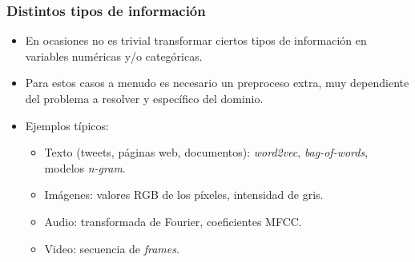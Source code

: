\documentclass{beamer}
\begin{document}
\begin{frame}
\frametitle{Distintos tipos de información}

\begin{itemize}\addtolength{\itemsep}{\fill}
\item En ocasiones no es trivial transformar ciertos tipos de información en variables numéricas y/o categóricas.
\item Para estos casos a menudo es necesario un preproceso extra, muy dependiente del problema a resolver y específico del dominio.
\item Ejemplos típicos:
\begin{itemize}
\item Texto (tweets, páginas web, documentos): \textit{word2vec}, \textit{bag-of-words}, modelos \textit{n-gram}.
\item Imágenes: valores RGB de los píxeles, intensidad de gris.
\item Audio: transformada de Fourier, coeficientes MFCC.
\item Video: secuencia de \textit{frames}.
\end{itemize}
\end{itemize}
\end{frame}
\end{document}
